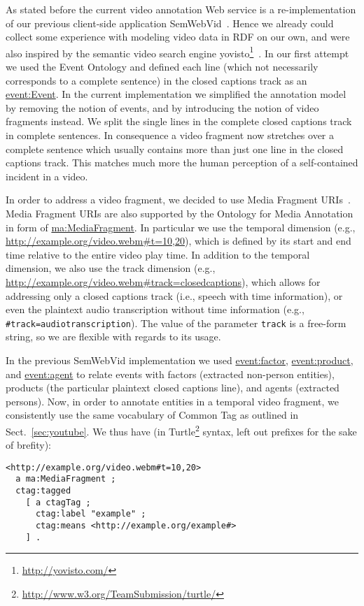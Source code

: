 \documentclass{acm_proc_article-sp}
\begin{document}
As stated before the current video annotation Web service is a re-implementation of our previous client-side application SemWebVid~\cite{Steiner:SemWebVid}. Hence we already could collect some experience with modeling video data in RDF on our own, and were also inspired by the semantic video search engine yovisto\footnote{\url{http://yovisto.com/}}~\cite{Sack:Use, Sack:VideoSearch}. In our first attempt we used the Event Ontology\cite{Raimond:Event} and defined each line (which not necessarily corresponds to a complete sentence) in the closed captions track as an \url{event:Event}. In the current implementation we simplified the annotation model by removing the notion of events, and by introducing the notion of video fragments instead. We split the single lines in the complete closed captions track in complete sentences. In consequence a video fragment now stretches over a complete sentence which usually contains more than just one line in the closed captions track. This matches much more the human perception of a self-contained incident in a video. 

In order to address a video fragment, we decided to use Media Fragment URIs~\cite{W3C:MediaFrags}. Media Fragment URIs are also supported by the Ontology for Media Annotation in form of \url{ma:MediaFragment}. In particular we use the temporal dimension (e.g., \url{http://example.org/video.webm#t=10,20}), which is defined by its start and end time relative to the entire video play time. In addition to the temporal dimension, we also use the track dimension (e.g., \url{http://example.org/video.webm#track=closedcaptions}), which allows for addressing only a closed captions track (i.e., speech with time information), or even the plaintext audio transcription without time information (e.g., \texttt{\#track=audiotranscription}). The value of the parameter \texttt{track} is a free-form string, so we are flexible with regards to its usage.

In the previous SemWebVid implementation we used \url{event:factor}, \url{event:product}, and \url{event:agent} to relate events with factors (extracted non-person entities), products (the particular plaintext closed captions line), and agents (extracted persons). Now, in order to annotate entities in a temporal video fragment, we consistently use the same vocabulary of Common Tag as outlined in Sect.~\ref{sec:youtube}. We thus have (in Turtle\footnote{\url{http://www.w3.org/TeamSubmission/turtle/}} syntax, left out prefixes for the sake of brefity):
\begin{lstlisting}
<http://example.org/video.webm#t=10,20> 
  a ma:MediaFragment ;
  ctag:tagged 
    [ a ctagTag ;
      ctag:label "example" ;
      ctag:means <http://example.org/example#>
    ] .
\end{lstlisting}
\end{document}
